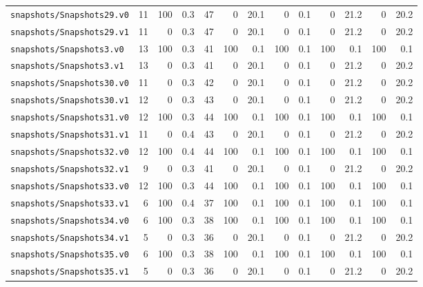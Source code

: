 \documentclass[a4paper,final]{llncs}
\begin{document}
\begin{scriptsize}
\begin{longtable}{l |r *{1}{rr} |r *{4}{rr}}
\verb|snapshots/Snapshots29.v0|  &  11  &  100  &  0.3  &  47  &  0  &  20.1  &  0  &  0.1  &  0  &  21.2  &  0  &  20.2  \\
\verb|snapshots/Snapshots29.v1|  &  11  &  0  &  0.3  &  47  &  0  &  20.1  &  0  &  0.1  &  0  &  21.2  &  0  &  20.2  \\
\verb|snapshots/Snapshots3.v0|  &  13  &  100  &  0.3  &  41  &  100  &  0.1  &  100  &  0.1  &  100  &  0.1  &  100  &  0.1  \\
\verb|snapshots/Snapshots3.v1|  &  13  &  0  &  0.3  &  41  &  0  &  20.1  &  0  &  0.1  &  0  &  21.2  &  0  &  20.2  \\
\verb|snapshots/Snapshots30.v0|  &  11  &  0  &  0.3  &  42  &  0  &  20.1  &  0  &  0.1  &  0  &  21.2  &  0  &  20.2  \\
\verb|snapshots/Snapshots30.v1|  &  12  &  0  &  0.3  &  43  &  0  &  20.1  &  0  &  0.1  &  0  &  21.2  &  0  &  20.2  \\
\verb|snapshots/Snapshots31.v0|  &  12  &  100  &  0.3  &  44  &  100  &  0.1  &  100  &  0.1  &  100  &  0.1  &  100  &  0.1  \\
\verb|snapshots/Snapshots31.v1|  &  11  &  0  &  0.4  &  43  &  0  &  20.1  &  0  &  0.1  &  0  &  21.2  &  0  &  20.2  \\
\verb|snapshots/Snapshots32.v0|  &  12  &  100  &  0.4  &  44  &  100  &  0.1  &  100  &  0.1  &  100  &  0.1  &  100  &  0.1  \\
\verb|snapshots/Snapshots32.v1|  &  9  &  0  &  0.3  &  41  &  0  &  20.1  &  0  &  0.1  &  0  &  21.2  &  0  &  20.2  \\
\verb|snapshots/Snapshots33.v0|  &  12  &  100  &  0.3  &  44  &  100  &  0.1  &  100  &  0.1  &  100  &  0.1  &  100  &  0.1  \\
\verb|snapshots/Snapshots33.v1|  &  6  &  100  &  0.4  &  37  &  100  &  0.1  &  100  &  0.1  &  100  &  0.1  &  100  &  0.1  \\
\verb|snapshots/Snapshots34.v0|  &  6  &  100  &  0.3  &  38  &  100  &  0.1  &  100  &  0.1  &  100  &  0.1  &  100  &  0.1  \\
\verb|snapshots/Snapshots34.v1|  &  5  &  0  &  0.3  &  36  &  0  &  20.1  &  0  &  0.1  &  0  &  21.2  &  0  &  20.2  \\
\verb|snapshots/Snapshots35.v0|  &  6  &  100  &  0.3  &  38  &  100  &  0.1  &  100  &  0.1  &  100  &  0.1  &  100  &  0.1  \\
\verb|snapshots/Snapshots35.v1|  &  5  &  0  &  0.3  &  36  &  0  &  20.1  &  0  &  0.1  &  0  &  21.2  &  0  &  20.2  \\

\end{longtable}
\end{scriptsize}
\end{document}
